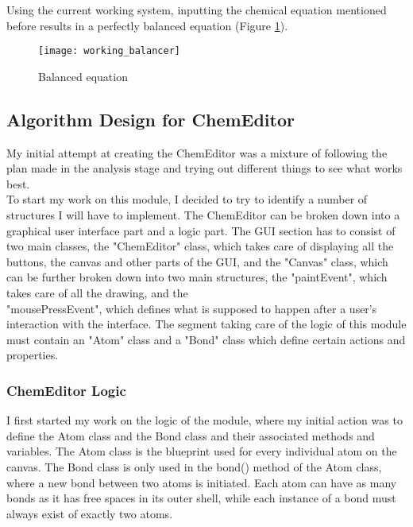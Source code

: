 \documentclass[a4paper,12pt]{article}
\begin{document}
Using the current working system, inputting the chemical equation mentioned before results in a perfectly balanced equation (Figure \ref{fig:working_balancer}).

\begin{figure} [h]
	\centering
	\texttt{[image: working\_balancer]}
	\caption{Balanced equation}
	\label{fig:working_balancer}
\end{figure}

\newpage

\subsection{Algorithm Design for ChemEditor}

My initial attempt at creating the ChemEditor was a mixture of following the plan made in the analysis stage and trying out different things to see what works best.\\
\linebreak
To start my work on this module, I decided to try to identify a number of structures I will have to implement. The ChemEditor can be broken down into a graphical user interface part and a logic part. The GUI section has to consist of two main classes, the "ChemEditor" class, which takes care of displaying all the buttons, the canvas and other parts of the GUI, and the "Canvas" class, which can be further broken down into two main structures, the "paintEvent", which takes care of all the drawing, and the\\ "mousePressEvent", which defines what is supposed to happen after a user's interaction with the interface. The segment taking care of the logic of this module must contain an "Atom" class and a "Bond" class which define certain actions and properties.\\

\subsubsection{ChemEditor Logic}

I first started my work on the logic of the module, where my initial action was to define the Atom class and the Bond class and their associated methods and variables. The Atom class is the blueprint used for every individual atom on the canvas. The Bond class is only used in the bond() method of the Atom class, where a new bond between two atoms is initiated. Each atom can have as many bonds as it has free spaces in its outer shell, while each instance of a bond must always exist of exactly two atoms.
\end{document}
